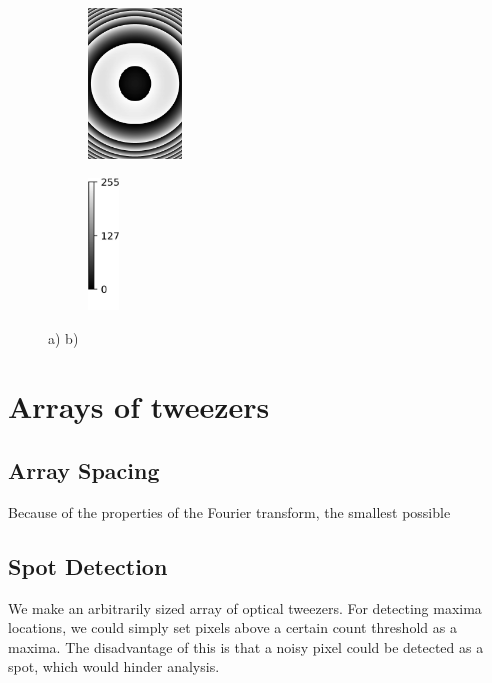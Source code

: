\begin{figure}
\begin{subfigure}{.18\linewidth}
		\caption{}
		\label{fig:Flatness}
	\end{subfigure}
	\begin{subfigure}{.18\linewidth}
		\centering
		\includegraphics[height=4cm]{figures/SLMphase/zernike.jpg}
		\caption{}
		\label{fig:Zernike}
	\end{subfigure}
	\begin{subfigure}{0.055\linewidth}
	    \centering
	    \includegraphics[height = 3.5cm]{figures/SLMphase/colorbar.jpg}
	\end{subfigure}
	\caption{a) b)}
	\label{fig:SLMphase}
\end{figure}



\section{Arrays of tweezers}

\subsection{Array Spacing}

Because of the properties of the Fourier transform, the smallest possible 

\subsection{Spot Detection}

We make an arbitrarily sized array of optical tweezers. For detecting maxima locations, we could simply set pixels above a certain count threshold as a maxima. The disadvantage of this is that a noisy pixel could be detected as a spot, which would hinder analysis. 

